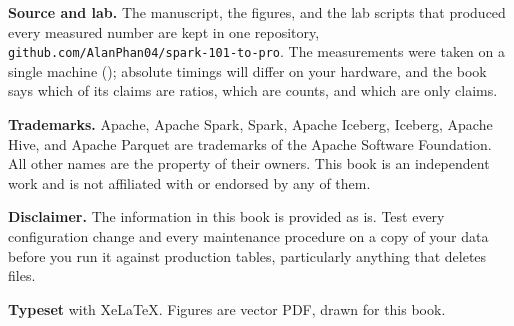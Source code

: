 \textbf{Source and lab.} The manuscript, the figures, and the lab scripts that
produced every measured number are kept in one repository,
\nolinkurl{github.com/AlanPhan04/spark-101-to-pro}. The measurements were taken
on a single machine (); absolute timings will differ on your
hardware, and the book says which of its claims are ratios, which are counts,
and which are only claims.

\textbf{Trademarks.} Apache, Apache Spark, Spark, Apache Iceberg, Iceberg, Apache
Hive, and Apache Parquet are trademarks of the Apache Software
Foundation. All other
names are the property of their owners. This book is an independent work and is
not affiliated with or endorsed by any of them.

\textbf{Disclaimer.} The information in this book is provided as is. Test every
configuration change and every maintenance procedure on a copy of your data
before you run it against production tables, particularly anything that deletes
files.

\textbf{Typeset} with XeLaTeX. Figures are vector PDF, drawn for this book.
\endgroup
\clearpage
